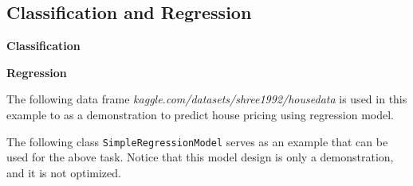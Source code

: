\subsection{Classification and Regression}

\vspace{0.1in}
\noindent \textbf{Classification}
\vspace{0.1in}



\vspace{0.1in}
\noindent \textbf{Regression}
\vspace{0.1in}

The following data frame \textit{kaggle.com/datasets/shree1992/housedata} is used in this example to as a demonstration to predict house pricing using regression model.

The following class \verb|SimpleRegressionModel| serves as an example that can be used for the above task. Notice that this model design is only a demonstration, and it is not optimized.

